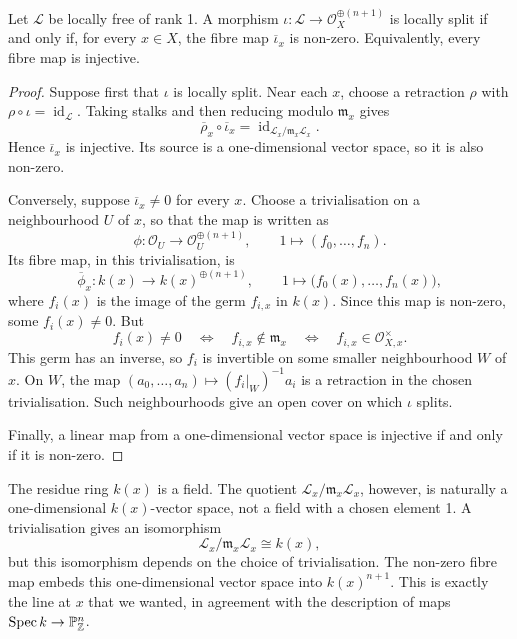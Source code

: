 \begin{proposition}\label{prop:lsi-fibre-criterion}
    Let \(\mathcal{L}\) be locally free of rank 1. A morphism
    \(\iota:\mathcal{L}\to\mathcal{O}_X^{\oplus(n+1)}\) is locally split
    if and only if, for every \(x\in X\), the fibre map
    \(\overline{\iota}_x\) is non-zero. Equivalently, every fibre map is
    injective.
\end{proposition}

\begin{proof}
    Suppose first that \(\iota\) is locally split. Near each \(x\), choose
    a retraction \(\rho\) with
    \(\rho\circ\iota=\operatorname{id}_{\mathcal{L}}\).
    Taking stalks and then reducing modulo \(\mathfrak{m}_x\) gives
    \[
        \overline{\rho}_x\circ\overline{\iota}_x
        =\operatorname{id}_{\mathcal{L}_x/
        \mathfrak{m}_x\mathcal{L}_x}.
    \]
    Hence \(\overline{\iota}_x\) is injective. Its source is a
    one-dimensional vector space, so it is also non-zero.

    Conversely, suppose \(\overline{\iota}_x\ne0\) for every \(x\).
    Choose a trivialisation on a neighbourhood \(U\) of \(x\), so that
    the map is written as
    \[
        \phi:\mathcal{O}_U\longrightarrow
        \mathcal{O}_U^{\oplus(n+1)},
        \qquad 1\longmapsto(f_0,\dots,f_n).
    \]
    Its fibre map, in this trivialisation, is
    \[
        \overline{\phi}_x:k(x)\longrightarrow k(x)^{\oplus(n+1)},
        \qquad 1\longmapsto\bigl(f_0(x),\dots,f_n(x)\bigr),
    \]
    where \(f_i(x)\) is the image of the germ \(f_{i,x}\) in \(k(x)\).
    Since this map is non-zero, some \(f_i(x)\ne0\). But
    \[
        f_i(x)\ne0
        \quad\Longleftrightarrow\quad
        f_{i,x}\notin\mathfrak{m}_x
        \quad\Longleftrightarrow\quad
        f_{i,x}\in\mathcal{O}_{X,x}^{\times}.
    \]
    This germ has an inverse, so \(f_i\) is invertible on some smaller
    neighbourhood \(W\) of \(x\). On \(W\), the map
    \((a_0,\dots,a_n)\mapsto(f_i|_W)^{-1}a_i\) is a retraction in the
    chosen trivialisation. Such neighbourhoods give an open cover on
    which \(\iota\) splits.

    Finally, a linear map from a one-dimensional vector space is
    injective if and only if it is non-zero.
\end{proof}

\begin{remark}\label{rem:lsi-fibre-line}
    The residue ring \(k(x)\) is a field. The quotient
    \(\mathcal{L}_x/\mathfrak{m}_x\mathcal{L}_x\), however, is naturally
    a one-dimensional \(k(x)\)-vector space, not a field with a chosen
    element 1. A trivialisation gives an isomorphism
    \[
        \mathcal{L}_x/\mathfrak{m}_x\mathcal{L}_x\cong k(x),
    \]
    but this isomorphism depends on the choice of trivialisation.
    The non-zero fibre map embeds this one-dimensional vector space
    into \(k(x)^{n+1}\). This is exactly the line at \(x\) that we wanted,
    in agreement with the description of maps
    \(\operatorname{Spec} k\to\mathbb{P}^n_{\mathbb{Z}}\).
\end{remark}

